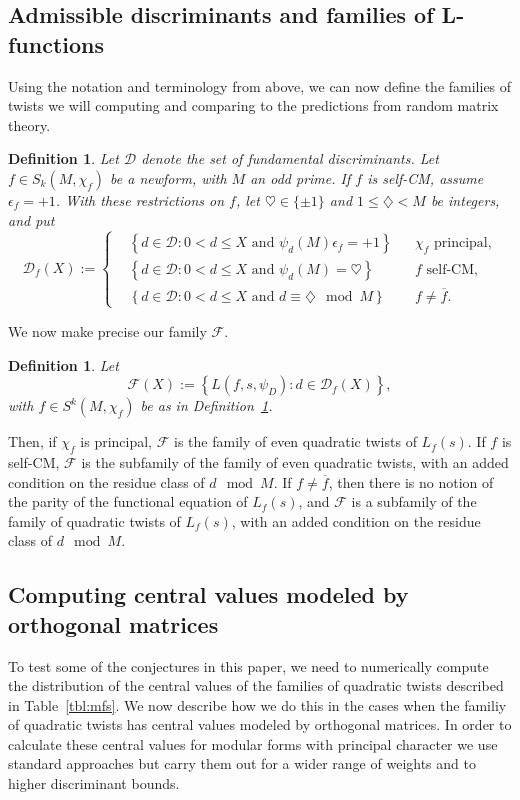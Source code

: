 \documentclass[11pt]{amsart}
\newcommand{\ep}{\epsilon}
\newcommand{\D}{\mathcal D_f}
\newcommand{\F}{\ensuremath{\mathcal{F}}}
\newcommand\be{\begin{equation}}
\newcommand\ee{\end{equation}}
\newtheorem{defn}[lemma]{Definition}
\begin{document}
\subsection{Admissible discriminants and families of L-functions}

Using the notation and terminology from above, we can now define the families of twists we will computing and comparing to the predictions from random matrix theory.

\begin{defn}\label{def:D}
  Let $\mathcal D$ denote the set of fundamental discriminants.  Let $f\in S_k(M,\chi_f)$ be a newform, with $M$ an odd prime. If $f$ is self-CM, assume $\ep_f=+1$.  With these restrictions on $f$, let $\heartsuit\in\{\pm1\}$ and $1\leq\diamondsuit<M$ be integers, and put
  \be\label{eq:dgooddef}\D(X):=\left\{\begin{aligned}
      &\left\{d\in\mathcal D:0<d\leq X\text{ and }\psi_d(M)\ep_f=+1\right\}
      &&\text{$\chi_f$ principal,} \\
      &\left\{d\in\mathcal D:0<d\leq X\text{ and }\psi_d(M)=\heartsuit \right\}
      &&\text{$f$ self-CM,} \\
      &\left\{d\in\mathcal D:0<d\leq X\text{ and }d\equiv\diamondsuit\mod M \right\}
      &&\text{$f\ne\overline f$.}\end{aligned}\right.\ee
\end{defn}
We now make precise our family $\F$.
\begin{defn}\label{def:F}
  Let \be\F(X):=\left\{L(f,s,\psi_D):d\in\D(X)\right\},\ee
  with $f\in S^k(M,\chi_f)$ be as in Definition~\ref{def:D}.
\end{defn}
Then, if $\chi_f$ is principal, $\F$ is the family of even quadratic twists of $L_f(s)$. If $f$ is self-CM, $\F$ is the subfamily of the family of even quadratic twists, with an added condition on the residue class of $d\mod M$.  If $f\ne\overline f$, then there is no notion of the parity of the functional equation of $L_f(s)$, and $\F$ is a subfamily of the family of quadratic twists of $L_f(s)$, with an added condition on the residue class of $d\mod M$.

\subsection{Computing central values modeled by orthogonal matrices}

To test some of the conjectures in this paper, we need to numerically compute the distribution of the central values of the families of quadratic twists described in Table~\ref{tbl:mfs}.  We now describe how we do this in the cases when the familiy of quadratic twists has central values modeled by orthogonal matrices.  In order to calculate these central values for modular forms with principal character we use standard approaches but carry them out for a wider range of weights and to higher discriminant bounds. 
\end{document}
